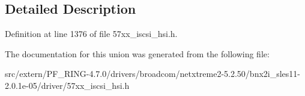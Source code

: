 \subsection{Detailed Description}


Definition at line 1376 of file 57xx\_\-iscsi\_\-hsi.h.



The documentation for this union was generated from the following file:\begin{DoxyCompactItemize}
\item 
src/extern/PF\_\-RING-\/4.7.0/drivers/broadcom/netxtreme2-\/5.2.50/bnx2i\_\-sles11-\/2.0.1e-\/05/driver/57xx\_\-iscsi\_\-hsi.h\end{DoxyCompactItemize}
